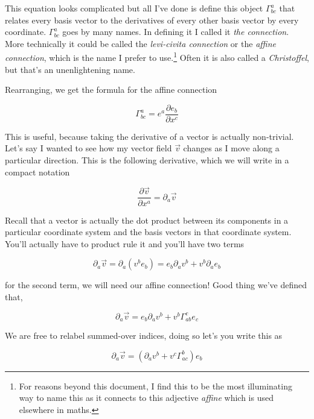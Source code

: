 \documentclass{article}
\begin{document}
This equation looks complicated but all I've done is define this object $\Gamma^a_{bc}$ that relates every basis vector to the derivatives of every other basis vector by every coordinate. $\Gamma^a_{bc}$ goes by many names. In defining it I called it \textit{the connection}. More technically it could be called the \textit{levi-civita connection} or the \textit{affine connection}, which is the name I prefer to use.\footnote{For reasons beyond this document, I find this to be the most illuminating way to name this as it connects to this adjective \textit{affine} which is used elsewhere in maths.} Often it is also called a \textit{Christoffel}, but that's an unenlightening name.

Rearranging, we get the formula for the affine connection

\begin{equation}
    \Gamma^a_{bc} = e^a \frac{\partial e_b}{\partial x^c}
\end{equation}

This is useful, because taking the derivative of a vector is actually non-trivial. Let's say I wanted to see how my vector field $\vec{v}$ changes as I move along a particular direction. This is the following derivative, which we will write in a compact notation

\begin{equation}
    \frac{\partial \vec{v}}{\partial x^a} = \partial_a\vec{v}
\end{equation}

Recall that a vector is actually the dot product between its components in a particular coordinate system and the basis vectors in that coordinate system. You'll actually have to product rule it and you'll have two terms

\begin{equation}
    \partial_a\vec{v} = \partial_a(v^b e_b) = e_b\partial_av^b + v^b\partial_ae_b
\end{equation}

for the second term, we will need our affine connection! Good thing we've defined that,

\begin{equation}
    \partial_a\vec{v} = e_b\partial_av^b + v^b \Gamma^c_{ab} e_c
\end{equation}

We are free to relabel summed-over indices, doing so let's you write this as

\begin{equation}
    \partial_a\vec{v} = (\partial_av^b + v^c \Gamma^b_{ac}) e_b
\end{equation}
\end{document}
